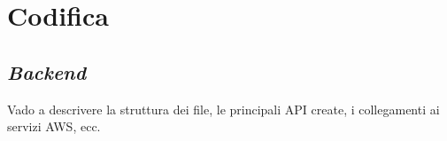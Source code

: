 \pagebreak
\section{Codifica}
\label{sez:codifica}


\pagebreak



\subsection{\textit{Backend}}
\label{sez:backend}

Vado a descrivere la struttura dei file, le principali API create, i collegamenti ai servizi AWS, ecc.\\